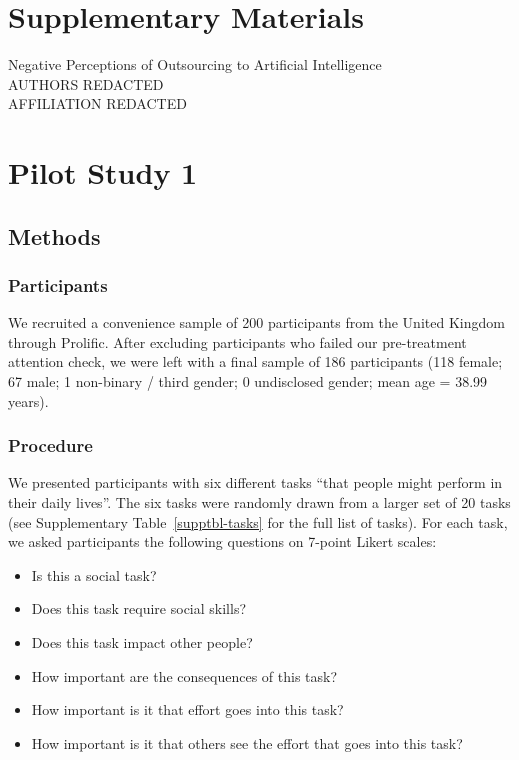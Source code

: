 \documentclass[
  man,
  floatsintext,
  longtable,
  nolmodern,
  notxfonts,
  notimes,
  colorlinks=true,linkcolor=blue,citecolor=blue,urlcolor=blue]{apa7}
\providecommand{\tightlist}{%
  \setlength{\itemsep}{0pt}\setlength{\parskip}{0pt}}
\begin{document}
\newpage

\vspace*{30mm}

\section*{Supplementary Materials}\label{supplementary-materials}

\setcounter{page}{1}
\begin{center}
Negative Perceptions of Outsourcing to Artificial Intelligence \\
AUTHORS REDACTED \\
AFFILIATION REDACTED
\end{center}
\vspace*{30mm}
\tableofcontents
\newpage

\section{Pilot Study 1}\label{pilot-study-1}

\subsection*{Methods}\label{methods-5}

\subsubsection*{Participants}\label{participants-5}

We recruited a convenience sample of 200 participants from the United
Kingdom through Prolific. After excluding participants who failed our
pre-treatment attention check, we were left with a final sample of 186
participants (118 female; 67 male; 1 non-binary / third gender; 0
undisclosed gender; mean age = 38.99 years).

\subsubsection*{Procedure}\label{procedure-5}

We presented participants with six different tasks ``that people might
perform in their daily lives''. The six tasks were randomly drawn from a
larger set of 20 tasks (see Supplementary Table~\ref{supptbl-tasks} for
the full list of tasks). For each task, we asked participants the
following questions on 7-point Likert scales:

\begin{itemize}
\tightlist
\item
  Is this a social task?
\item
  Does this task require social skills?
\item
  Does this task impact other people?
\item
  How important are the consequences of this task?
\item
  How important is it that effort goes into this task?
\item
  How important is it that others see the effort that goes into this
  task?
\end{itemize}
\end{document}
